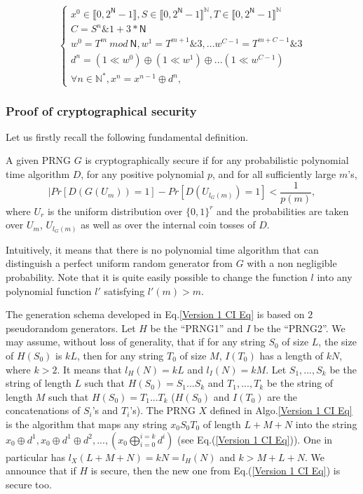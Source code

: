 \begin{equation}
\left\{
\begin{array}{l}
x^0 \in \llbracket 0, 2^\mathsf{N}-1 \rrbracket, S \in \llbracket 0, 2^\mathsf{N}-1 \rrbracket^\mathds{N}, T \in \llbracket 0, 2^\mathsf{N}-1 \rrbracket^\mathds{N}\\
C = S^n \& 1 + 3*\mathsf{N}\\
w^0 = {T}^m~mod~\mathsf{N}, w^1 = {T}^{m+1} \& 3, ... w^{C-1} = {T}^{m+C-1} \& 3\\ 
d^n = (1 \ll w^0) \oplus (1\ll w^1) \oplus ... (1 \ll w^{C-1})\\
\forall n \in \mathds{N}^*, x^n = x^{n-1} \oplus d^n,
\end{array}
\right.
\label{Version 1 CI Eq}
\end{equation}


\subsubsection{Proof of cryptographical security}
\label{proof1}
Let us firstly recall the following fundamental
definition.
\begin{definition}
\label{CSPRNG}
A given PRNG $G$ is cryptographically secure if for any probabilistic polynomial time algorithm $D$, for any positive polynomial $p$, and for all sufficiently large $m$'s,  
\begin{equation}
|Pr[D(G(U_m))=1]-Pr[D(U_{l_G(m)})=1]<\frac{1}{p(m)},
\end{equation}
where $U_r$ is the uniform distribution over $\{0, 1\}^r$ and the probabilities are taken over $U_m$, $U_{l_G(m)}$ as well as over the internal coin tosses of $D$.
\end{definition}

Intuitively, it means that there is no polynomial time algorithm that can distinguish a perfect uniform random generator from $G$ with a non negligible probability. Note that it is quite easily possible to change the function $l$ into any polynomial function $l'$ satisfying $l'(m)>m$.

The generation schema developed in Eq.\ref{Version 1 CI Eq} is based on $2$ pseudorandom generators. Let $H$ be the ``PRNG1'' and $I$ be the ``PRNG2''. We may assume, without loss of generality, that if for any string $S_0$ of size $L$, the size of $H(S_0)$ is $kL$,  then for any string $T_0$ of size $M$, $I(T_0)$ has a length of $kN$, where $k > 2$. It means that $l_H(N) = kL$ and $l_I(N) = kM$. Let $S_1,...,S_k$ be the string of length $L$ such that $H(S_0) = S_1 ... S_k$ and $T_1,...,T_k$ be the string of length $M$ such that $H(S_0) = T_1 ... T_k$ ($H(S_0)$ and $I(T_0)$ are the concatenations of $S_i$'s and $T_i$'s). The PRNG $X$ defined in Algo.\ref{Version 1 CI Eq} is the algorithm that maps any string $x_0S_0T_0$ of length $L+M+N$ into the string $x_0 \oplus d^1, x_0 \oplus d^1 \oplus d^2,...,(x_0 \bigoplus^{i=k}_{i=0}d^i)$ (see Eq.(\ref{Version 1 CI Eq})). One in particular has $l_X(L+M+N) = kN = l_H(N)$ and $k > M+L+N$. We announce that if $H$ is secure, then the new one from Eq.(\ref{Version 1 CI Eq}) is secure too.

